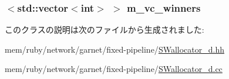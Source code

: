 \label{classSWallocator__d_a2d66b8cad5144408ed492eeff4d37c2f}
\hypertarget{classSWallocator__d_ac0ce291e579e519a16f76107b9796052}{
\subsubsection[{m\_\-vc\_\-winners}]{$<${\bf std::vector}$<$int$>$ $>$ {\bf m\_\-vc\_\-winners}}}
\label{classSWallocator__d_ac0ce291e579e519a16f76107b9796052}


このクラスの説明は次のファイルから生成されました:\begin{DoxyCompactItemize}
\item 
mem/ruby/network/garnet/fixed-\/pipeline/\hyperlink{SWallocator__d_8hh}{SWallocator\_\-d.hh}\item 
mem/ruby/network/garnet/fixed-\/pipeline/\hyperlink{SWallocator__d_8cc}{SWallocator\_\-d.cc}\end{DoxyCompactItemize}
